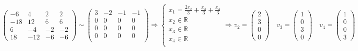 \documentclass{article}
\begin{document}
$$\begin{pmatrix}
-6 & 4 & 2 & 2 \\
-18 & 12 & 6 & 6 \\
6 & -4 & -2 & -2 \\
18 & -12 & -6 & -6
\end{pmatrix} \sim \begin{pmatrix}
3 & -2 & -1 & -1 \\
0 & 0 & 0 & 0 \\
0 & 0 & 0 & 0 \\
0 & 0 & 0 & 0 \\
\end{pmatrix} \Rightarrow \begin{cases}
x_1 = \frac{2x_2}{3} + \frac{x_3}{3} + \frac{x_4}{3} \\
x_2 \in \mathbb{R} \\
x_3 \in \mathbb{R} \\
x_4 \in \mathbb{R} \\
\end{cases} \Rightarrow v_2 = \begin{pmatrix}
2 \\ 3 \\ 0 \\ 0
\end{pmatrix} \quad v_3 = \begin{pmatrix}
1 \\ 0 \\ 3 \\ 0
\end{pmatrix} \quad v_4 = \begin{pmatrix}
1 \\ 0 \\ 0 \\ 3
\end{pmatrix}$$ \\
\end{document}

